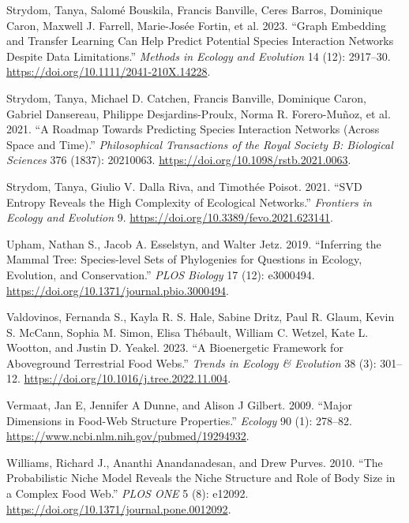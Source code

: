\documentclass[
  letterpaper,
  DIV=11,
  numbers=noendperiod]{scrartcl}
\newlength{\cslhangindent}
\newenvironment{CSLReferences}[2] %
 {\begin{list}{}{%
  \setlength{\itemindent}{0pt}
  \setlength{\leftmargin}{0pt}
  \setlength{\parsep}{0pt}
  \ifodd #1
   \setlength{\leftmargin}{\cslhangindent}
   \setlength{\itemindent}{-1\cslhangindent}
  \fi
  \setlength{\itemsep}{#2\baselineskip}}}
 {\end{list}}
\begin{document}
\begin{CSLReferences}{1}{0}
Strydom, Tanya, Salomé Bouskila, Francis Banville, Ceres Barros,
Dominique Caron, Maxwell J. Farrell, Marie-Josée Fortin, et al. 2023.
{``Graph Embedding and Transfer Learning Can Help Predict Potential
Species Interaction Networks Despite Data Limitations.''} \emph{Methods
in Ecology and Evolution} 14 (12): 2917--30.
\url{https://doi.org/10.1111/2041-210X.14228}.

Strydom, Tanya, Michael D. Catchen, Francis Banville, Dominique Caron,
Gabriel Dansereau, Philippe Desjardins-Proulx, Norma R. Forero-Muñoz, et
al. 2021. {``A Roadmap Towards Predicting Species Interaction Networks
(Across Space and Time).''} \emph{Philosophical Transactions of the
Royal Society B: Biological Sciences} 376 (1837): 20210063.
\url{https://doi.org/10.1098/rstb.2021.0063}.

Strydom, Tanya, Giulio V. Dalla Riva, and Timothée Poisot. 2021. {``{SVD
Entropy Reveals} the {High Complexity} of {Ecological Networks}.''}
\emph{Frontiers in Ecology and Evolution} 9.
\url{https://doi.org/10.3389/fevo.2021.623141}.

Upham, Nathan S., Jacob A. Esselstyn, and Walter Jetz. 2019.
{``Inferring the Mammal Tree: {Species-level} Sets of Phylogenies for
Questions in Ecology, Evolution, and Conservation.''} \emph{PLOS
Biology} 17 (12): e3000494.
\url{https://doi.org/10.1371/journal.pbio.3000494}.

Valdovinos, Fernanda S., Kayla R. S. Hale, Sabine Dritz, Paul R. Glaum,
Kevin S. McCann, Sophia M. Simon, Elisa Thébault, William C. Wetzel,
Kate L. Wootton, and Justin D. Yeakel. 2023. {``A Bioenergetic Framework
for Aboveground Terrestrial Food Webs.''} \emph{Trends in Ecology \&
Evolution} 38 (3): 301--12.
\url{https://doi.org/10.1016/j.tree.2022.11.004}.

Vermaat, Jan E, Jennifer A Dunne, and Alison J Gilbert. 2009. {``Major
Dimensions in Food-Web Structure Properties.''} \emph{Ecology} 90 (1):
278--82. \url{https://www.ncbi.nlm.nih.gov/pubmed/19294932}.

Williams, Richard J., Ananthi Anandanadesan, and Drew Purves. 2010.
{``The {Probabilistic Niche Model Reveals} the {Niche Structure} and
{Role} of {Body Size} in a {Complex Food Web}.''} \emph{PLOS ONE} 5 (8):
e12092. \url{https://doi.org/10.1371/journal.pone.0012092}.


\end{CSLReferences}
\end{document}
